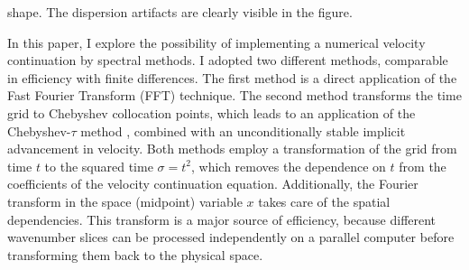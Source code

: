shape. The dispersion artifacts are clearly visible in the figure.
\par
In this paper, I explore the possibility of implementing a numerical
velocity continuation by spectral methods. I adopted two different
methods, comparable in efficiency with finite differences.  The first
method is a direct application of the Fast Fourier Transform (FFT)
technique.  The second method transforms the time grid to Chebyshev
collocation points, which leads to an application of the
Chebyshev-$\tau$ method \cite[]{lanc,orszag,boyd}, combined with an
unconditionally stable implicit advancement in velocity.  Both methods
employ a transformation of the grid from time $t$ to the squared time
$\sigma = t^2$, which removes the dependence on $t$ from the
coefficients of the velocity continuation equation. Additionally, the
Fourier transform in the space (midpoint) variable $x$ takes care of
the spatial dependencies. This transform is a major source of
efficiency, because different wavenumber slices can be processed
independently on a parallel computer before transforming them back to
the physical space.
\par
